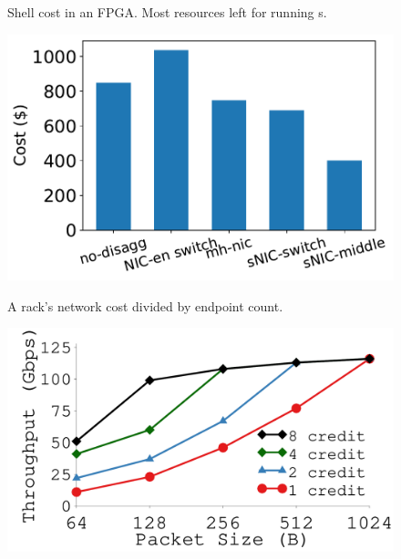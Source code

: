 {\begin{figure}[th]
\begin{minipage}{\figWidthSix}
\begin{center}
\begin{tabular}{ p{0.6in} | p{0.2in} |p{0.27in} }
\end{tabular}
\vspace{-0.05in}
{
Shell cost in an FPGA. Most resources left for running \nt{}s.
}
\end{center}
\end{minipage}
\fi
\begin{minipage}{\figWidthSix}
\begin{center}
\centerline{\includegraphics[width=\columnwidth]{Figures/fig-single-rack-capex-perDevCost.pdf}}
\vspace{-0.1in}
{
A rack's network cost divided by endpoint count. 
}
\end{center}
\end{minipage}
\begin{minipage}{\figWidthSix}
\begin{center}
\centerline{\includegraphics[width=\columnwidth]{Figures/g_plot_credit.pdf}}
\vspace{-0.1in}

\end{center}
\end{minipage}
\end{figure}}
